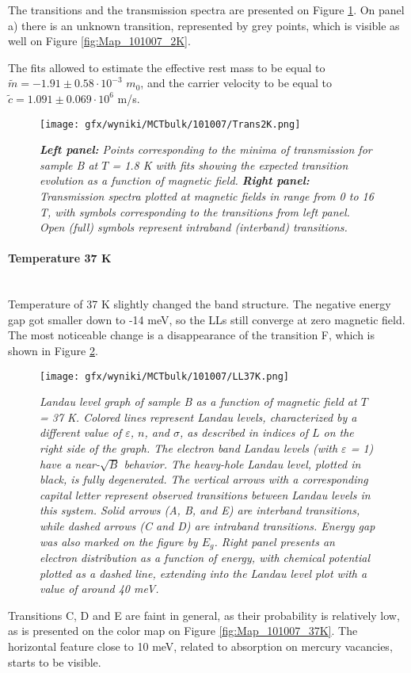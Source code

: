 \documentclass[titlepage,a4paper]{book}
\newcommand{\wciecie}{\quad\phantom{v}}
\newcommand{\myparagraph}[1]{\paragraph{#1}\mbox{}\\}
\begin{document}
The transitions and the transmission spectra are presented on Figure \ref{fig:Spectra_101007_2K}. On panel a) there is an unknown transition, represented by grey points, which is visible as well on Figure \ref{fig:Map_101007_2K}.

The fits allowed to estimate the effective rest mass to be equal to $\tilde m = -1.91 \pm 0.58 \cdot 10^{-3}$ $m_0$, and the carrier velocity to be equal to $\tilde{c} = 1.091 \pm 0.069 \cdot 10^6$ m/s. 

\begin{figure}[ht]
	\centering
	\texttt{[image: gfx/wyniki/MCTbulk/101007/Trans2K.png]}
	\vspace{-10pt}
	\caption{\textit{\textbf{Left panel:} Points corresponding to the minima of transmission for sample B at $T$ = 1.8 K with fits showing the expected transition evolution as a function of magnetic field. \textbf{Right panel:} Transmission spectra plotted at magnetic fields in range from 0 to 16 T, with symbols corresponding to the transitions from left panel. Open (full) symbols represent intraband (interband) transitions.}}
	\label{fig:Spectra_101007_2K}
\end{figure} 

\newpage
\myparagraph{Temperature 37 K}
\wciecie
Temperature of 37 K slightly changed the band structure. The negative energy gap got smaller down to -14 meV, so the LLs still converge at zero magnetic field. The most noticeable change is a disappearance of the transition F, which is shown in Figure \ref{fig:LL_101007_37K}. 

\begin{figure}[ht]
	\centering
	\texttt{[image: gfx/wyniki/MCTbulk/101007/LL37K.png]}
	\vspace{-10pt}
	\caption{\textit{Landau level graph of sample B as a function of magnetic field at $T$ = 37 K. Colored lines represent Landau levels, characterized by a different value of $\varepsilon$, $n$, and $\sigma$, as described in indices of $L$ on the right side of the graph. The electron band Landau levels (with $\varepsilon$ = 1) have a near-$\sqrt{B}$ behavior. The heavy-hole Landau level, plotted in black, is fully degenerated. The vertical arrows with a corresponding capital letter represent observed transitions between Landau levels in this system. Solid arrows (A, B, and E) are interband transitions, while dashed arrows (C and D) are intraband transitions. Energy gap was also marked on the figure by $E_g$. Right panel presents an electron distribution as a function of energy, with chemical potential plotted as a dashed line, extending into the Landau level plot with a value of around 40 meV.}}
	\label{fig:LL_101007_37K}
\end{figure}
Transitions C, D and E are faint in general, as their probability is relatively low, as is presented on the color map on Figure \ref{fig:Map_101007_37K}. The horizontal feature close to 10 meV, related to absorption on mercury vacancies, starts to be visible.
\end{document}
